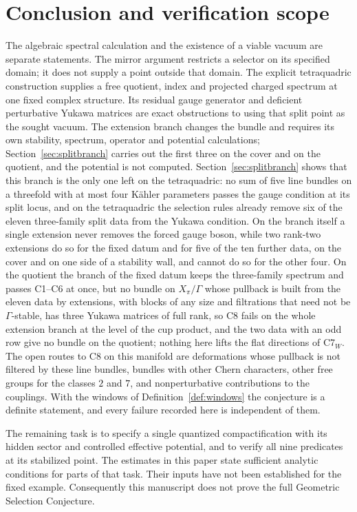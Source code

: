 \section{Conclusion and verification scope}\label{sec:conclusion}
The algebraic spectral calculation and the existence of a viable vacuum
are separate statements. The mirror argument restricts a selector on its
specified domain; it does not supply a point outside that domain.
The explicit tetraquadric construction supplies a free quotient, index
and projected charged spectrum at one fixed complex structure.
Its residual gauge generator and deficient perturbative Yukawa matrices
are exact obstructions to using that split point as the sought vacuum.
The extension branch changes the bundle and requires its own stability,
spectrum, operator and potential calculations; Section~\ref{sec:splitbranch}
carries out the first three on the cover and on the quotient, and the
potential is not computed.
Section~\ref{sec:splitbranch} shows that this branch is the only one left
on the tetraquadric: no sum of five line bundles on a threefold with at
most four K\"ahler parameters passes the gauge condition at its split
locus, and on the tetraquadric the selection rules already remove six of
the eleven three-family split data from the Yukawa condition. On the
branch itself a single extension never removes the forced gauge boson,
while two rank-two extensions do so for the fixed datum and for five of
the ten further data, on the cover and on one side of a stability wall,
and cannot do so for the other four. On the quotient the branch of the
fixed datum keeps the three-family spectrum and passes C1--C6 at once,
but no bundle on $X_\pi/\Gamma$ whose pullback is built from the eleven
data by extensions, with blocks of any size and filtrations that need not
be $\Gamma$-stable, has three Yukawa matrices of full rank, so C8 fails on
the whole extension branch at the level of the cup product, and the two
data with an odd row give no bundle on the quotient;
nothing here lifts the flat directions of C7$_W$.
The open routes to C8 on this manifold are deformations whose pullback
is not filtered by these line bundles, bundles with other Chern
characters, other free groups for the classes $2$ and $7$, and
nonperturbative contributions to the couplings. With the windows of
Definition~\ref{def:windows} the conjecture is a definite statement, and
every failure recorded here is independent of them.

The remaining task is to specify a single quantized compactification
with its hidden sector and controlled effective potential, and to verify
all nine predicates at its stabilized point. The estimates in this paper
state sufficient analytic conditions for parts of that task. Their
inputs have not been established for the fixed example. Consequently this
manuscript does not prove the full Geometric Selection Conjecture.

